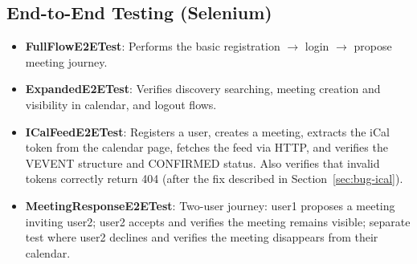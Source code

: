 \documentclass[11pt]{article}
\begin{document}
  \subsection{End-to-End Testing (Selenium)}
  \begin{itemize}
    \item \textbf{FullFlowE2ETest}: Performs the basic registration $\rightarrow$ login $\rightarrow$ propose meeting journey.
    \item \textbf{ExpandedE2ETest}: Verifies discovery searching, meeting creation and visibility in calendar, and logout flows.
    \item \textbf{ICalFeedE2ETest}: Registers a user, creates a meeting, extracts the iCal token from the calendar page, fetches the feed via HTTP, and verifies the VEVENT structure and CONFIRMED status. Also verifies that invalid tokens correctly return 404 (after the fix described in Section~\ref{sec:bug-ical}).
    \item \textbf{MeetingResponseE2ETest}: Two-user journey: user1 proposes a meeting inviting user2; user2 accepts and verifies the meeting remains visible; separate test where user2 declines and verifies the meeting disappears from their calendar.
  \end{itemize}
\end{document}
